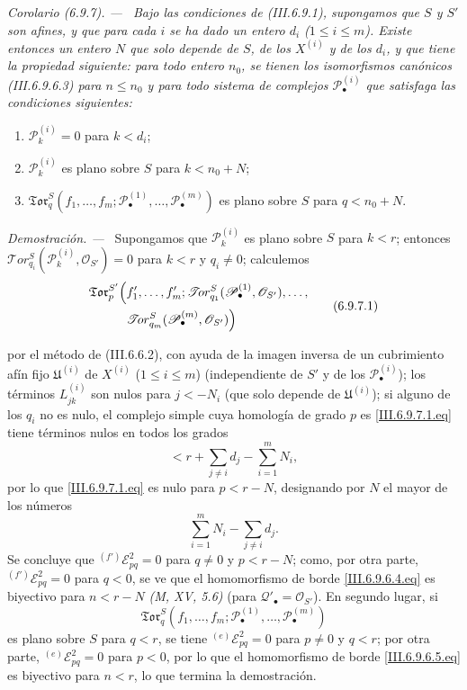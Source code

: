 \documentclass[10pt,oneside]{book}
\newcommand{\sref}[2][]{\textup{(#2)}}
\newcommand{\oldpage}[2][]{\setcounter{footnote}{0}\marginpar{\scriptsize\textbf{#1}~|~#2}\ignorespaces}
\newenvironment{corollary}[1][]{\par\medskip\noindent\itshape Corolario (#1). ---\ }{\par}
\newenvironment{proof}{\par\medskip\noindent\textit{Demostración. ---\ }}{\par}
\providecommand{\setmin}{-}%
\begin{document}
\begin{corollary}[6.9.7]
\label{III.6.9.7}
Bajo las condiciones de \sref{III.6.9.1}, supongamos que $S$ y $S'$ son
afines, y que para cada $i$ se ha dado un entero $d_i$
($1\leq i\leq m$). Existe entonces un entero $N$ que solo depende de $S$, de
los $X^{(i)}$ y de los $d_i$, y que tiene la propiedad siguiente: para todo
entero $n_0$, se tienen los isomorfismos canónicos \sref{III.6.9.6.3} para
$n\leq n_0$ y para todo sistema de complejos
$\mathscr P_\bullet^{(i)}$ que satisfaga las condiciones siguientes:
\begin{enumerate}
  \item[$1^\circ$] $\mathscr P_k^{(i)}=0$ para $k<d_i$;
  \item[$2^\circ$] $\mathscr P_k^{(i)}$ es plano sobre $S$ para
  $k<n_0+N$;
  \item[$3^\circ$]
  $\mathfrak{Tor}_q^S(f_1,\ldots,f_m;
  \mathscr P_\bullet^{(1)},\ldots,\mathscr P_\bullet^{(m)})$ es plano sobre
  $S$ para $q<n_0+N$.
\end{enumerate}
\end{corollary}

\begin{proof}
Supongamos que $\mathscr P_k^{(i)}$ es plano sobre $S$ para $k<r$; entonces
$\mathscr{T}\!or_{q_i}^S(\mathscr P_k^{(i)},\mathscr O_{S'})=0$ para $k<r$
y $q_i\ne0$; calculemos
\[
\begin{split}
  \mathfrak{Tor}_p^{S'}\Bigl(
  &f'_1,\ldots,f'_m;
  \mathscr{T}\!or_{q_1}^S(\mathscr P_\bullet^{(1)},\mathscr O_{S'}),
  \ldots,\\
  &\mathscr{T}\!or_{q_m}^S(\mathscr P_\bullet^{(m)},\mathscr O_{S'})
  \Bigr)
\end{split}
\tag{6.9.7.1}\label{III.6.9.7.1.eq}
\]

\oldpage[III]{170}
por el método de \sref{III.6.6.2}, con ayuda de la imagen inversa de un
cubrimiento afín fijo $\mathfrak U^{(i)}$ de $X^{(i)}$
($1\leq i\leq m$) (independiente de $S'$ y de los
$\mathscr P_\bullet^{(i)}$); los términos $L_{jk}^{(i)}$ son nulos para
$j<\setmin N_i$ (que solo depende de $\mathfrak U^{(i)}$); si alguno de los $q_i$
no es nulo, el complejo simple cuya homología de grado $p$ es
\eqref{III.6.9.7.1.eq} tiene términos nulos en todos los grados
\[
  <r+\sum_{j\ne i}d_j\setmin\sum_{i=1}^m N_i,
\]
por lo que \eqref{III.6.9.7.1.eq} es nulo para $p<r\setmin N$, designando por $N$
el mayor de los números
\[
  \sum_{i=1}^m N_i\setmin\sum_{j\ne i}d_j.
\]
Se concluye que ${}^{(f')}\mathscr E_{pq}^2=0$ para $q\ne0$ y $p<r\setmin N$;
como, por otra parte, ${}^{(f')}\mathscr E_{pq}^2=0$ para $q<0$, se ve que el
homomorfismo de borde \eqref{III.6.9.6.4.eq} es biyectivo para $n<r\setmin N$
\emph{(M, XV, 5.6)} (para $\mathscr Q'_\bullet=\mathscr O_{S'}$). En segundo
lugar, si
\[
  \mathfrak{Tor}_q^S
  (f_1,\ldots,f_m;
   \mathscr P_\bullet^{(1)},\ldots,\mathscr P_\bullet^{(m)})
\]
es plano sobre $S$ para $q<r$, se tiene
${}^{(e)}\mathscr E_{pq}^2=0$ para $p\ne0$ y $q<r$; por otra parte,
${}^{(e)}\mathscr E_{pq}^2=0$ para $p<0$, por lo que el homomorfismo de borde
\eqref{III.6.9.6.5.eq} es biyectivo para $n<r$, lo que termina la
demostración.
\end{proof}
\end{document}
